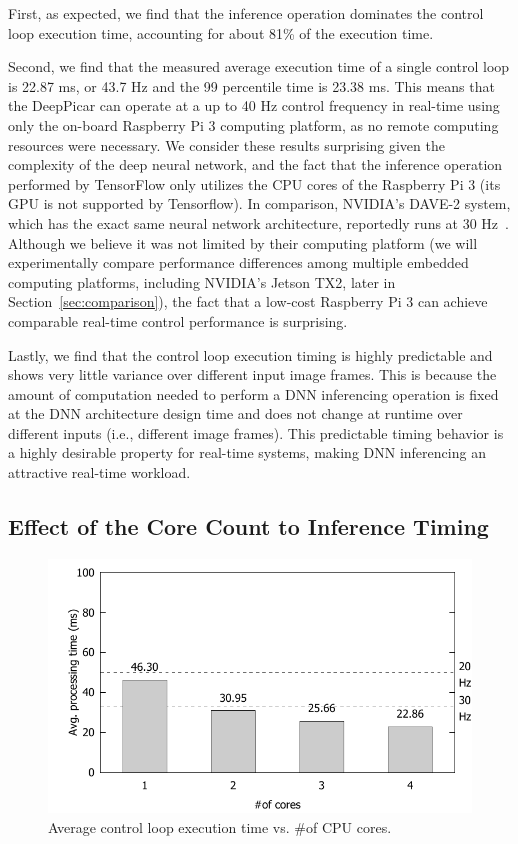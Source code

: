 First, as expected, we find that the inference operation
dominates the control loop execution time, accounting for about 81\% of
the execution time.

Second, we find that the measured average
execution time of a single control loop is 22.87 ms, or 43.7 Hz and
the 99 percentile time is 23.38 ms.
This means that the DeepPicar can operate
at a up to 40 Hz control frequency in real-time using only the on-board
Raspberry Pi 3 computing platform, as no remote computing resources 
were necessary. We consider these results surprising given the complexity
of the deep neural network, and the fact that the inference operation
performed by TensorFlow only utilizes the CPU cores of the
Raspberry Pi 3 (its GPU is not supported by Tensorflow).
In comparison, NVIDIA's DAVE-2 system, which has the exact same neural
network architecture, reportedly runs at 30 Hz~\cite{Bojarski2016}. 
Although we believe it was not
limited by their computing platform (we will experimentally compare
performance differences among multiple embedded computing platforms,
including NVIDIA's Jetson TX2, later in
Section~\ref{sec:comparison}), the fact that a low-cost
Raspberry Pi 3 can achieve comparable real-time control performance is
surprising.

Lastly, we find that the control loop execution timing is highly
predictable and shows very little variance over different input image
frames. This is because the amount of computation needed to perform
a DNN inferencing operation is fixed at the DNN architecture design
time and does not change at runtime over different inputs (i.e.,
different image frames). This predictable timing behavior is a highly
desirable property for real-time systems, making DNN inferencing an
attractive real-time workload.

\subsection{Effect of the Core Count to Inference Timing}

\begin{figure}[h]
  \centering
  \includegraphics[width=.7\textwidth]{figs/perf_vs_corecnt}
  \caption{Average control loop execution time vs. \#of CPU
    cores.}
  \label{fig:perf-vs-corecnt}
\end{figure}

